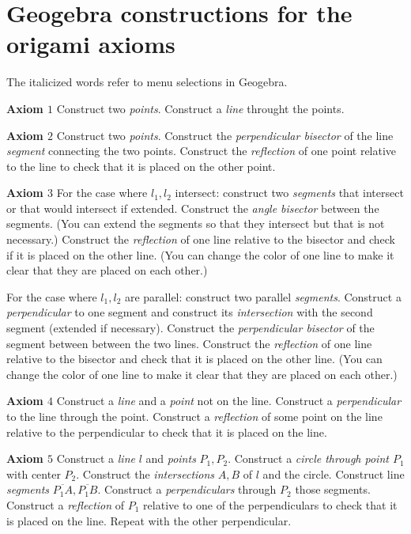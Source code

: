 \section{Geogebra constructions for the origami axioms}


The italicized words refer to menu selections in Geogebra.

\textbf{Axiom $1$} Construct two \emph{points}. Construct a \emph{line} throught the points.

\textbf{Axiom $2$} Construct two \emph{points}. Construct the \emph{perpendicular bisector} of the line \emph{segment} connecting the two points. Construct the \emph{reflection} of one point relative to the line to check that it is placed on the other point.

\textbf{Axiom $3$} For the case where $l_1,l_2$ intersect: construct two \emph{segments} that intersect or that would intersect if extended. Construct the \emph{angle bisector} between the segments. (You can extend the segments so that they intersect but that is not necessary.) Construct the \emph{reflection} of one line relative to the bisector and check if it is placed on the other line. (You can change the color of one line to make it clear that they are placed on each other.)

For the case where $l_1,l_2$ are parallel: construct two parallel \emph{segments}. Construct a \emph{perpendicular} to one segment and construct its \emph{intersection} with the second segment (extended if necessary). Construct the \emph{perpendicular bisector} of the segment between between the two lines. Construct the \emph{reflection} of one line relative to the bisector and check that it is placed on the other line. (You can change the color of one line to make it clear that they are placed on each other.)

\textbf{Axiom $4$} Construct a \emph{line} and a \emph{point} not on the line. Construct a \emph{perpendicular} to the line through the point. Construct a \emph{reflection} of some point on the line relative to the perpendicular to check that it is placed on the line.

\textbf{Axiom $5$} Construct a \emph{line} $l$ and \emph{points} $P_1,P_2$. Construct a \emph{circle through point $P_1$} with center $P_2$. Construct the \emph{intersections} $A,B$ of $l$ and the circle. Construct line \emph{segments} $\overline{P_1A}, \overline{P_1B}$. Construct a \emph{perpendiculars} through $P_2$ those segments. Construct a \emph{reflection} of $P_1$ relative to one of the perpendiculars to check that it is placed on the line. Repeat with the other perpendicular.

